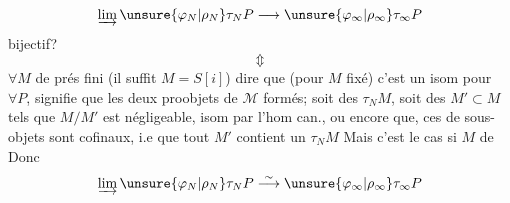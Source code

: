 \[
\varinjlim\unsure{\varphi_N|\rho_N}\tau_NP
 \longrightarrow\unsure{\varphi_\infty|\rho_\infty}\tau_\infty P
\]
bijectif?
\[\Updownarrow\]
\(\forall M\) de prés fini (il suffit \(M=S[i]\))
dire que (pour \(M\) fixé) c'est un isom pour \(\forall P\), signifie que les deux
proobjets de \(\mathcal M\) formés; soit des \(\tau_NM\), soit des
\(M'\subset M\) tels que \(M/M'\) est négligeable,  isom par
l'hom can., ou encore que, ces  de sous-objets sont cofinaux,
i.e que tout \(M'\) contient un \(\tau_NM\)
Mais c'est le cas si \(M\) de 
Donc
\[
\varinjlim\unsure{\varphi_N|\rho_N}\tau_NP
 \overset\sim\longrightarrow\unsure{\varphi_\infty|\rho_\infty}\tau_\infty P
\]
